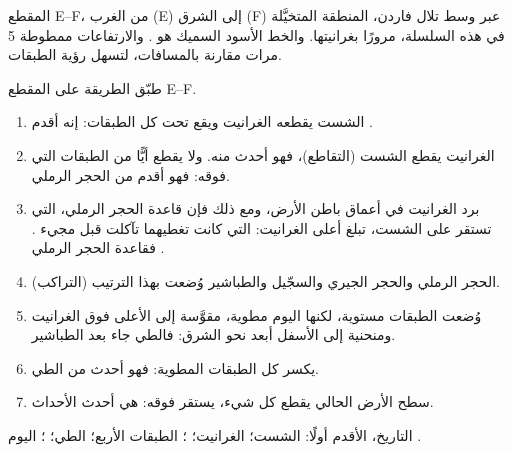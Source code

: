 \begin{omfigure}
\smallskip
{\small المقطع E--F، من الغرب (E) إلى الشرق (F) عبر وسط تلال فاردن،
المنطقة المتخيَّلة في هذه السلسلة، مرورًا بغرانيتها. والخط الأسود السميك
هو . والارتفاعات ممطوطة 5 مرات مقارنة بالمسافات، لتسهل رؤية
الطبقات.}
\label{fig:g7:geological-time:section}
\end{omfigure}

\begin{example}\label{ex:g7:geological-time:varden}
طبّق الطريقة على المقطع E--F.
\begin{enumerate}
  \item الشست يقطعه الغرانيت ويقع تحت كل الطبقات: إنه أقدم .
  \item الغرانيت يقطع الشست (التقاطع)، فهو أحدث منه. ولا يقطع أيًّا من
        الطبقات التي فوقه: فهو أقدم من الحجر الرملي.
  \item برد الغرانيت في أعماق باطن الأرض، ومع ذلك فإن قاعدة الحجر الرملي،
        التي تستقر على الشست، تبلغ أعلى الغرانيت:  التي كانت
        تغطيهما تآكلت قبل مجيء . فقاعدة الحجر الرملي .
  \item الحجر الرملي والحجر الجيري والسجّيل والطباشير وُضعت بهذا الترتيب
        (التراكب).
  \item وُضعت الطبقات مستوية، لكنها اليوم مطوية، مقوَّسة إلى الأعلى فوق
        الغرانيت ومنحنية إلى الأسفل أبعد نحو الشرق: فالطي جاء بعد
        الطباشير.
  \item {} يكسر كل الطبقات المطوية: فهو أحدث من الطي.
  \item سطح الأرض الحالي يقطع كل شيء،   يستقر فوقه: 
         هي أحدث الأحداث.
\end{enumerate}
التاريخ، الأقدم أولًا: الشست؛ الغرانيت؛ ؛ الطبقات الأربع؛ الطي؛
؛  اليوم  .
\end{example}

